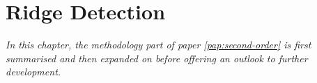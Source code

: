 \chapter{Ridge Detection}
\label{chap:erm}

\textit{In this chapter, the methodology part of paper \ref{pap:second-order} is first summarised and then expanded on before offering an outlook to further development.}




%
